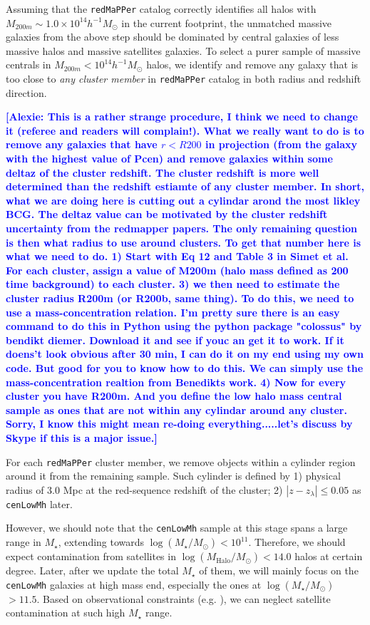 \documentclass{emulateapj}
\def\redm{\texttt{redMaPPer}}
\def\nbcg{\texttt{cenLowMh}}
\def\mstar{{$M_{\star}$}}
\def\logms{{$\log (M_{\star}/M_{\odot})$}}
\def\logmh{{$\log (M_{\mathrm{Halo}}/M_{\odot})$}}
\newcommand{\alexie}[1]{\textcolor{blue}{\textbf{[Alexie: #1]}}}
\begin{document}
\begin{CJK*}{UTF8}{gbsn}
    Assuming that the \redm{} catalog correctly identifies all halos with 
    $M_{200m}\sim 1.0\times 10^{14} h^{-1} M_{\odot}$ in the current footprint,
    the unmatched massive galaxies from the above step should be dominated by central 
    galaxies of less massive halos and massive satellites galaxies.  
    To select a purer sample of massive centrals in $M_{200m}<10^{14} h^{-1} M_{\odot}$
    halos, we identify and remove any galaxy that is too close to 
    \emph{any cluster member} in \redm{} catalog in both radius and redshift direction.
    
    \alexie{This is a rather strange procedure, I think we need to change it (referee and readers will complain!). What we really want to do is to remove any galaxies that have $r<R200$ in projection (from the galaxy with the highest value of Pcen) and remove galaxies within some deltaz of the cluster redshift. The cluster redshift is more well determined than the redshift estiamte of any cluster member. In short, what we are doing here is cutting out a cylindar arond the most likley BCG. The deltaz value can be motivated by the cluster redshift uncertainty from the redmapper papers. The only remaining question is then what radius to use around clusters. To get that number here is what we need to do. 1) Start with Eq 12 and Table 3 in Simet et al. For each cluster, assign a value of M200m (halo mass defined as 200 time background) to each cluster. 3) we then need to estimate the cluster radius R200m (or R200b, same thing). To do this, we need to use a mass-concentration relation. I'm pretty sure there is an easy command to do this in Python using the python package "colossus" by bendikt diemer. Download it and see if youc an get it to work. If it doens't look obvious after 30 min, I can do it on my end using my own code. But good for you to know how to do this. We can simply use the mass-concentration realtion from Benedikts work. 4) Now for every cluster you have R200m. And you define the low halo mass central sample as ones that are not within any cylindar around any cluster. Sorry, I know this might mean re-doing everything.....let's discuss by Skype if this is a major issue.}
    
    For each \redm{} cluster member, we remove objects within a cylinder region 
    around it from the remaining sample. 
    Such cylinder is defined by 1) physical radius of 3.0 Mpc at the red-sequence 
    redshift of the cluster; 2) $|z - z_{\lambda}| \leq 0.05$ as 
    \nbcg{} later. 
    
    However, we should note that the \nbcg{} sample at this stage spans a large range
    in \mstar{}, extending towards \logms{}$<10^{11}$.  
    Therefore, we should expect contamination from satellites in \logmh{}$< 14.0$ halos
    at certain degree.  
    Later, after we update the total \mstar{} of them, we will mainly focus on the 
    \nbcg{} galaxies at high mass end, especially the ones at \logms{}$ > 11.5$. 
    Based on observational constraints (e.g. \citealt{vanUitert2016}), we can neglect 
    satellite contamination at such high \mstar{} range. 


\end{CJK*}
\end{document}
